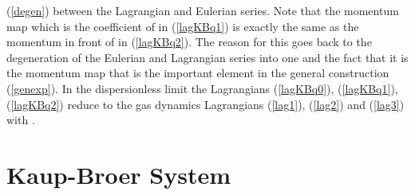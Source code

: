 \documentclass[a4paper,12pt]{article}
\begin{document}
(\ref{degen}) between the Lagrangian and Eulerian series. Note
that the momentum map which is the coefficient of \coordHE{} in
(\ref{lagKBq1}) is exactly the same as the momentum in front of
\coordHE{} in (\ref{lagKBq2}). The reason for this goes back to the
degeneration of the Eulerian and Lagrangian series into one and
the fact that it is the momentum map that is the important element
in the general construction (\ref{genexp}). In the dispersionless
limit the Lagrangians (\ref{lagKBq0}), (\ref{lagKBq1}),
(\ref{lagKBq2}) reduce to the gas dynamics Lagrangians
(\ref{lag1}), (\ref{lag2}) and (\ref{lag3}) with \coordHE{}.

\section{Kaup-Broer System}
\end{document}
